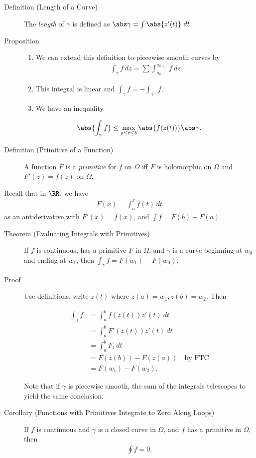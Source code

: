 \begin{description}
\item[Definition (Length of a Curve)]
The \emph{length} of \(\gamma\) is defined as
\(\abs \gamma = \int \abs{z'(t)} ~dt\).
\item[Proposition]
\begin{enumerate}
\def\labelenumi{\arabic{enumi}.}
\item
  We can extend this definition to piecewise smooth curves by
  \begin{align*}
  \int_\gamma f~dz = \sum \int_{a_k}^{a_{k+1}} f ~dz
  \end{align*}
\item
  This integral is linear and \(\int_\gamma f = -\int_{\gamma^-} f\).
\item
  We have an inequality
\end{enumerate}

\begin{align*}
\abs{\int_\gamma f} \leq \max_{a\leq t \leq b} \abs{f(z(t))} \abs\gamma
.\end{align*}
\item[Definition (Primitive of a Function)]
A function \(F\) is a \emph{primitive} for \(f\) on \(\Omega\) iff \(F\)
is holomorphic on \(\Omega\) and \(F'(z) = f(z)\) on \(\Omega\).
\end{description}

Recall that in \(\RR\), we have
\begin{align*}F(x) =\int_a^x f(t)~dt\end{align*} as an antiderivative
with \(F'(x) = f(x)\), and \(\int f = F(b) - F(a)\).

\begin{description}
\item[Theorem (Evaluating Integrals with Primitives)]
If \(f\) is continuous, has a primitive \(F\) in \(\Omega\), and
\(\gamma\) is a curve beginning at \(w_0\) and ending at \(w_1\), then
\(\int_\gamma f = F(w_1) - F(w_0)\).
\item[Proof]
Use definitions, write \(z(t)\) where \(z(a) = w_1, z(b) = w_2\). Then

\begin{align*}
\int_\gamma f &= \int_a^b f(z(t)) z'(t) ~ dt \\
&= \int_a^b F'(z(t)) z'(t) ~dt \\
&= \int_a^b F_t ~dt \\
&= F(z(b)) - F(z(a)) \quad\text{by FTC}\\
&= F(w_1) - F(w_2)
.\end{align*}

Note that if \(\gamma\) is piecewise smooth, the sum of the integrals
telescopes to yield the same conclusion.
\item[Corollary (Functions with Primitives Integrate to Zero Along
Loops)]
If \(f\) is continuous and \(\gamma\) is a closed curve in \(\Omega\),
and \(f\) has a primitive in \(\Omega\), then
\begin{align*}\oint f = 0.\end{align*}
\end{description}

